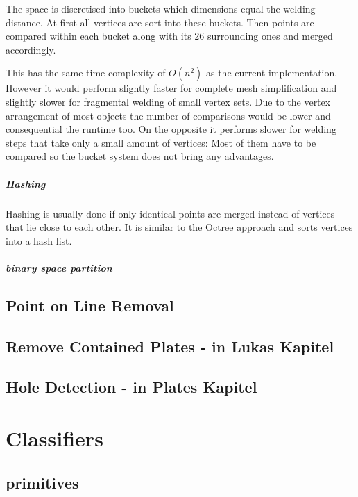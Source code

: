 \documentclass[../ClassicThesis.tex]{subfiles}
\begin{document}
The space is discretised into buckets which dimensions equal the welding distance. At first all vertices are sort into these buckets. Then points are compared within each bucket along with its 26 surrounding ones and merged accordingly.

This has the same time complexity of $O(n^2)$ as the current implementation. However it would perform slightly faster for complete mesh simplification and slightly slower for fragmental welding of small vertex sets. Due to the vertex arrangement of most objects the number of comparisons would be lower and consequential the runtime too. On the opposite it performs slower for welding steps that take only a small amount of vertices: Most of them have to be compared so the bucket system does not bring any advantages.

\paragraph{Hashing}

Hashing is usually done if only identical points are merged instead of vertices that lie close to each other. It is similar to the Octree approach and sorts vertices into a hash list. 

\paragraph{binary space partition}





\section{Point on Line Removal}

\section{Remove Contained Plates - in Lukas Kapitel}

\section{Hole Detection - in Plates Kapitel}


\chapter{Classifiers}
\section{primitives}
\end{document}
